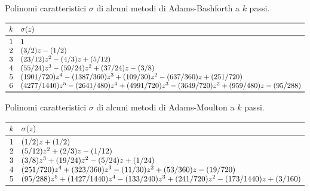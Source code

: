 

\begin{table}[p]
\caption{Polinomi caratteristici $\sigma$ di alcuni metodi di
Adams-Bashforth a $k$ passi.}
\label{tab:lmf-adams-bashforth-coefficients}
\vspace*{-2.5ex}
\begin{equation*}
\begin{array}{cl}
\toprule
k & \sigma(z) \\
\midrule
1 & 1 \\
2 & (3/2)z-(1/2) \\
3 & (23/12)z^2-(4/3)z+(5/12) \\
4 & (55/24)z^3-(59/24)z^2+(37/24)z-(3/8) \\
5 & (1901/720)z^4-(1387/360)z^3+(109/30)z^2-(637/360)z+(251/720) \\
6 & (4277/1440)z^5-(2641/480)z^4+(4991/720)z^3-(3649/720)z^2+(959/480)z-(95/288) \\
\bottomrule
\end{array}
\end{equation*}
\end{table}



\begin{table}[p]
\caption{Polinomi caratteristici $\sigma$ di alcuni metodi di
Adams-Moulton a $k$ passi.}
\label{tab:lmf-adams-moulton-coefficients}
\vspace*{-2.5ex}
\begin{equation*}
\begin{array}{cl}
\toprule
k & \sigma(z) \\
\midrule
1 & (1/2)z+(1/2) \\
2 & (5/12)z^2+(2/3)z-(1/12) \\
3 & (3/8)z^3+(19/24)z^2-(5/24)z+(1/24) \\
4 & (251/720)z^4+(323/360)z^3-(11/30)z^2+(53/360)z-(19/720) \\
5 & (95/288)z^5+(1427/1440)z^4-(133/240)z^3+(241/720)z^2-(173/1440)z+(3/160) \\
\bottomrule
\end{array}
\end{equation*}
\end{table}

